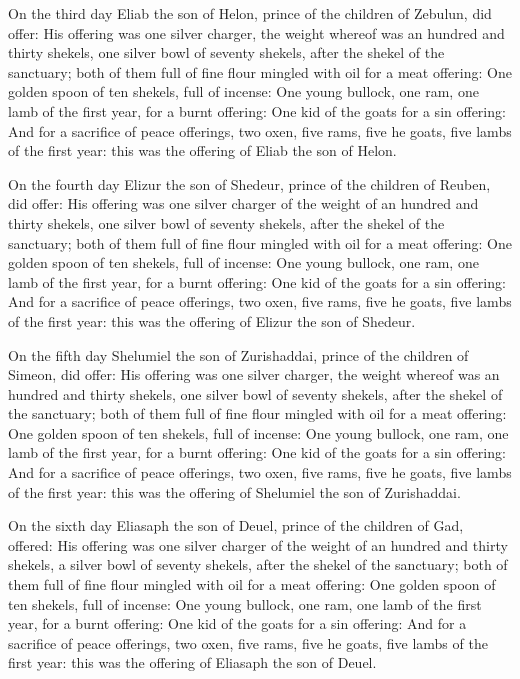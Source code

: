  On the third day Eliab the son of Helon, prince of the
children of Zebulun, did offer:  His offering was one
silver charger, the weight whereof was an hundred and thirty shekels,
one silver bowl of seventy shekels, after the shekel of the sanctuary;
both of them full of fine flour mingled with oil for a meat offering:
 One golden spoon of ten shekels, full of incense:
 One young bullock, one ram, one lamb of the first year,
for a burnt offering:  One kid of the goats for a sin
offering:  And for a sacrifice of peace offerings, two
oxen, five rams, five he goats, five lambs of the first year: this was
the offering of Eliab the son of Helon.

 On the fourth day Elizur the son of Shedeur, prince of the
children of Reuben, did offer:  His offering was one silver
charger of the weight of an hundred and thirty shekels, one silver bowl
of seventy shekels, after the shekel of the sanctuary; both of them full
of fine flour mingled with oil for a meat offering:  One
golden spoon of ten shekels, full of incense:  One young
bullock, one ram, one lamb of the first year, for a burnt offering:
 One kid of the goats for a sin offering:  And
for a sacrifice of peace offerings, two oxen, five rams, five he goats,
five lambs of the first year: this was the offering of Elizur the son of
Shedeur.

 On the fifth day Shelumiel the son of Zurishaddai, prince
of the children of Simeon, did offer:  His offering was one
silver charger, the weight whereof was an hundred and thirty shekels,
one silver bowl of seventy shekels, after the shekel of the sanctuary;
both of them full of fine flour mingled with oil for a meat offering:
 One golden spoon of ten shekels, full of incense:
 One young bullock, one ram, one lamb of the first year,
for a burnt offering:  One kid of the goats for a sin
offering:  And for a sacrifice of peace offerings, two
oxen, five rams, five he goats, five lambs of the first year: this was
the offering of Shelumiel the son of Zurishaddai.

 On the sixth day Eliasaph the son of Deuel, prince of the
children of Gad, offered:  His offering was one silver
charger of the weight of an hundred and thirty shekels, a silver bowl of
seventy shekels, after the shekel of the sanctuary; both of them full of
fine flour mingled with oil for a meat offering:  One
golden spoon of ten shekels, full of incense:  One young
bullock, one ram, one lamb of the first year, for a burnt offering:
 One kid of the goats for a sin offering:  And
for a sacrifice of peace offerings, two oxen, five rams, five he goats,
five lambs of the first year: this was the offering of Eliasaph the son
of Deuel.

